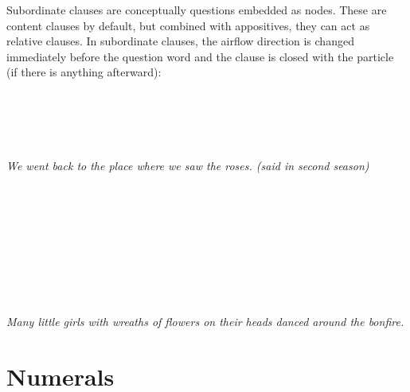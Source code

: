\documentclass{book}
\begin{document}
Subordinate clauses are conceptually questions embedded as nodes. These are content clauses by default, but combined with appositives, they can act as relative clauses. In subordinate clauses, the airflow direction is changed immediately before the question word and the clause is closed with the particle  (if there is anything afterward): \\
~\\
 \\
 \\
          \\
~\\
\emph{We went back to the place where we saw the roses. (said in second season)} \\
~\\
 \\
 \\
  \hliii{=}       \hlx{$\lrcorner$} \\
~\\
 \\
 \\
    \\
~\\
\emph{Many little girls with wreaths of flowers on their heads danced around the bonfire.}

\chapter{Numerals}
\label{chapter:numerals}
\end{document}
